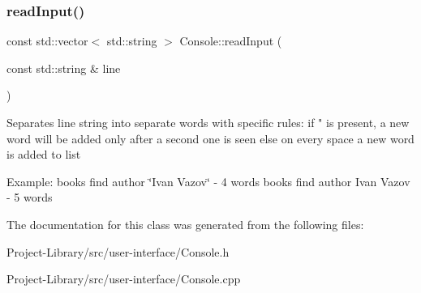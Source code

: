 \subsubsection{\texorpdfstring{read\+Input()}{readInput()}}
{\footnotesize\ttfamily const std\+::vector$<$ std\+::string $>$ Console\+::read\+Input (\begin{DoxyParamCaption}\item[{const std\+::string \&}]{line }\end{DoxyParamCaption})\hspace{0.3cm}{\ttfamily [static]}}

Separates line string into separate words with specific rules\+: if \textquotesingle{} " \textquotesingle{} is present, a new word will be added only after a second one is seen else on every space a new word is added to list

Example\+: books find author \char`\"{}\+Ivan Vazov\char`\"{} -\/ 4 words books find author Ivan Vazov -\/ 5 words 

The documentation for this class was generated from the following files\+:\begin{DoxyCompactItemize}
\item 
Project-\/\+Library/src/user-\/interface/Console.\+h\item 
Project-\/\+Library/src/user-\/interface/Console.\+cpp\end{DoxyCompactItemize}
